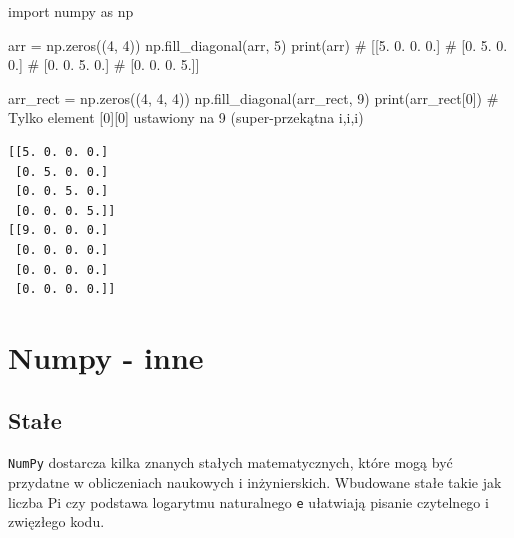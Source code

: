 \documentclass[
  polish,
  letterpaper,
  DIV=11,
  numbers=noendperiod]{scrreprt}
\newenvironment{Shaded}{\begin{snugshade}}{\end{snugshade}}
\newcommand{\BuiltInTok}[1]{\textcolor[rgb]{0.00,0.23,0.31}{#1}}
\newcommand{\CommentTok}[1]{\textcolor[rgb]{0.37,0.37,0.37}{#1}}
\newcommand{\DecValTok}[1]{\textcolor[rgb]{0.68,0.00,0.00}{#1}}
\newcommand{\ImportTok}[1]{\textcolor[rgb]{0.00,0.46,0.62}{#1}}
\newcommand{\NormalTok}[1]{\textcolor[rgb]{0.00,0.23,0.31}{#1}}
\newcommand{\OperatorTok}[1]{\textcolor[rgb]{0.37,0.37,0.37}{#1}}
\begin{document}
\begin{Shaded}
\begin{Highlighting}[]
\ImportTok{import}\NormalTok{ numpy }\ImportTok{as}\NormalTok{ np}

\NormalTok{arr }\OperatorTok{=}\NormalTok{ np.zeros((}\DecValTok{4}\NormalTok{, }\DecValTok{4}\NormalTok{))}
\NormalTok{np.fill\_diagonal(arr, }\DecValTok{5}\NormalTok{)}
\BuiltInTok{print}\NormalTok{(arr)}
\CommentTok{\# [[5. 0. 0. 0.]}
\CommentTok{\#  [0. 5. 0. 0.]}
\CommentTok{\#  [0. 0. 5. 0.]}
\CommentTok{\#  [0. 0. 0. 5.]]}

\NormalTok{arr\_rect }\OperatorTok{=}\NormalTok{ np.zeros((}\DecValTok{4}\NormalTok{, }\DecValTok{4}\NormalTok{, }\DecValTok{4}\NormalTok{))}
\NormalTok{np.fill\_diagonal(arr\_rect, }\DecValTok{9}\NormalTok{)}
\BuiltInTok{print}\NormalTok{(arr\_rect[}\DecValTok{0}\NormalTok{])  }\CommentTok{\# Tylko element [0][0] ustawiony na 9 (super{-}przekątna i,i,i)}
\end{Highlighting}
\end{Shaded}

\begin{verbatim}
[[5. 0. 0. 0.]
 [0. 5. 0. 0.]
 [0. 0. 5. 0.]
 [0. 0. 0. 5.]]
[[9. 0. 0. 0.]
 [0. 0. 0. 0.]
 [0. 0. 0. 0.]
 [0. 0. 0. 0.]]
\end{verbatim}

\chapter{Numpy - inne}\label{numpy---inne}

\section{Stałe}\label{staux142e}

\texttt{NumPy} dostarcza kilka znanych stałych matematycznych, które
mogą być przydatne w obliczeniach naukowych i inżynierskich. Wbudowane
stałe takie jak liczba Pi czy podstawa logarytmu naturalnego \texttt{e}
ułatwiają pisanie czytelnego i zwięzłego kodu.
\end{document}
